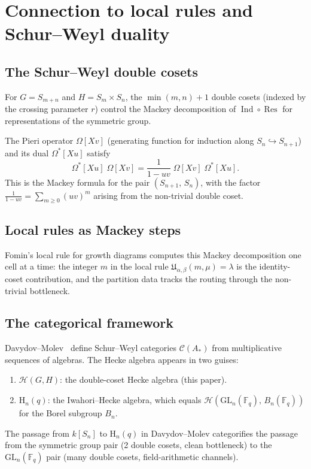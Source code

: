\documentclass[12pt,a4paper]{article}
\theoremstyle{definition}
\theoremstyle{remark}
\newcommand{\F}{\mathbb{F}}
\newcommand{\fU}{\mathfrak{U}}
\newcommand{\Ind}{\operatorname{Ind}}
\newcommand{\Res}{\operatorname{Res}}
\newcommand{\GL}{\mathrm{GL}}
\newcommand{\Hecke}{\mathcal{H}}
\begin{document}
\section{Connection to local rules and Schur--Weyl duality}
\label{sec:local-rules}

\subsection{The Schur--Weyl double cosets}

For $G = S_{m+n}$ and $H = S_m \times S_n$, the $\min(m,n) + 1$
double cosets (indexed by the crossing parameter $r$) control the
Mackey decomposition of $\Ind \circ \Res$ for representations of
the symmetric group.

The Pieri operator $\Omega[Xv]$ (generating function for induction
along $S_n \hookrightarrow S_{n+1}$) and its dual $\Omega^*[Xu]$
satisfy
\[
  \Omega^*[Xu]\;\Omega[Xv]
  = \frac{1}{1-uv}\;\Omega[Xv]\;\Omega^*[Xu].
\]
This is the Mackey formula for the pair $(S_{n+1},\, S_n)$, with the
factor $\frac{1}{1-uv} = \sum_{m \geqslant 0}(uv)^m$ arising from
the non-trivial double coset.

\subsection{Local rules as Mackey steps}

Fomin's local rule for growth diagrams computes this Mackey
decomposition one cell at a time: the integer $m$ in the local rule
$\fU_{\alpha,\beta}(m, \mu) = \lambda$ is the identity-coset
contribution, and the partition data tracks the routing through the
non-trivial bottleneck.

\subsection{The categorical framework}

Davydov--Molev~\cite{DM} define Schur--Weyl categories
$\mathcal{C}(A_*)$ from multiplicative sequences of algebras.
The Hecke algebra appears in two guises:
\begin{enumerate}
\item $\Hecke(G, H)$: the double-coset Hecke algebra (this paper).
\item $\mathrm{H}_n(q)$: the Iwahori--Hecke algebra, which equals
  $\Hecke(\GL_n(\F_q),\, B_n(\F_q))$ for the Borel subgroup $B_n$.
\end{enumerate}
The passage from $k[S_n]$ to $\mathrm{H}_n(q)$ in Davydov--Molev
categorifies the passage from the symmetric group pair (2 double
cosets, clean bottleneck) to the $\GL_n(\F_q)$ pair (many double
cosets, field-arithmetic channels).
\end{document}
